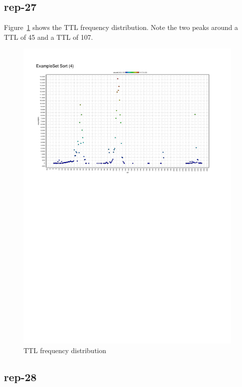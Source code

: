 \documentclass{article}
\begin{document}
\subsection{rep-27}

Figure~\ref{figure:rep-27} shows the TTL frequency distribution. Note the two peaks around a
TTL of 45 and a TTL of 107.


\begin{figure}[h]
    \centering
    \includegraphics[clip, trim=1cm 17cm 2cm 2cm, width=1.00\textwidth]{../exercise-4/ttl.pdf}
    \caption{\label{figure:rep-27} TTL frequency distribution}
\end{figure}

\subsection{rep-28}
\end{document}
